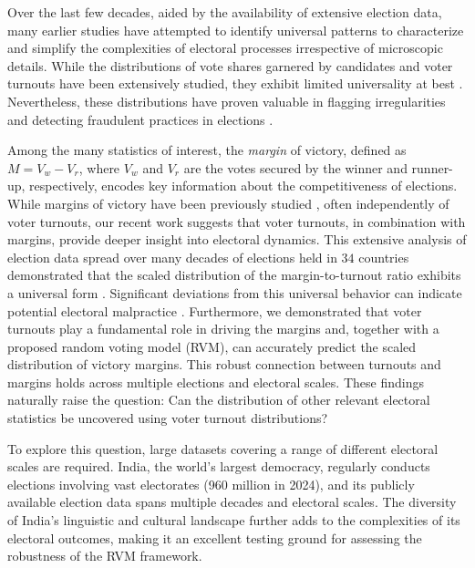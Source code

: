 \documentclass[reprint, pre, twocolumn, aps, showpacs, superscriptaddress]{revtex4-2}
\begin{document}
Over the last few decades, aided by the availability of extensive election data, many earlier studies \cite{CosAlmAnd1999, ForCas2007, mantovani2011scaling, ChaMitFor2013, BokSzaVat2018, hosel2019universality} have attempted to identify universal patterns to characterize and simplify the complexities of electoral processes irrespective of microscopic details. While the distributions of vote shares garnered by candidates \cite{CalCroAnt2015, BurRanGir2016, MorHisNak2019, Kon2017} and voter turnouts\cite{BorBou2010, BorRayBou2012} have been extensively studied, they exhibit limited universality at best \cite{CosAlmAnd1999, ForCas2007, ChaMitFor2013}. Nevertheless, these distributions have proven valuable in flagging irregularities and detecting fraudulent practices in elections \cite{klimek2012statistical, jimenez2017testing, rozenas2017detecting}.

Among the many statistics of interest, the \emph{margin} of victory, defined as $M = V_w - V_r$, where $V_w$ and $V_r$ are the votes secured by the winner and runner-up, respectively, encodes key information about the competitiveness of elections. While margins of victory have been previously studied \cite{jacobson1987marginals, mccann1997threatening, mulligan2003empirical, magrino2011computing, xia2012computing, bhattacharyya2021predicting}, often independently of voter turnouts, our recent work \cite{pal2024universal} suggests that voter turnouts, in combination with margins, provide deeper insight into electoral dynamics. This extensive analysis of election data spread over many decades of elections held in $34$ countries demonstrated that the scaled distribution of the margin-to-turnout ratio exhibits a universal form \cite{pal2024universal}. Significant deviations from this universal behavior can indicate potential electoral malpractice \cite{pal2024universal, brigaldino2011elections, frear2014parliamentary, belarus_report, czwolek2021belarusian, bedford_2021}. Furthermore, we demonstrated that voter turnouts play a fundamental role in driving the margins and, together with a proposed random voting model (RVM), can accurately predict the scaled distribution of victory margins. This robust connection between turnouts and margins holds across multiple elections and electoral scales. These findings naturally raise the question: Can the distribution of other relevant electoral statistics be uncovered using voter turnout distributions?

To explore this question, large datasets covering a range of different electoral scales are required. India, the world's largest democracy, regularly conducts elections involving vast electorates (960 million in 2024), and its publicly available election data spans multiple decades and electoral scales. The diversity of India's linguistic and cultural landscape further adds to the complexities of its electoral outcomes, making it an excellent testing ground for assessing the robustness of the RVM framework.
\end{document}
